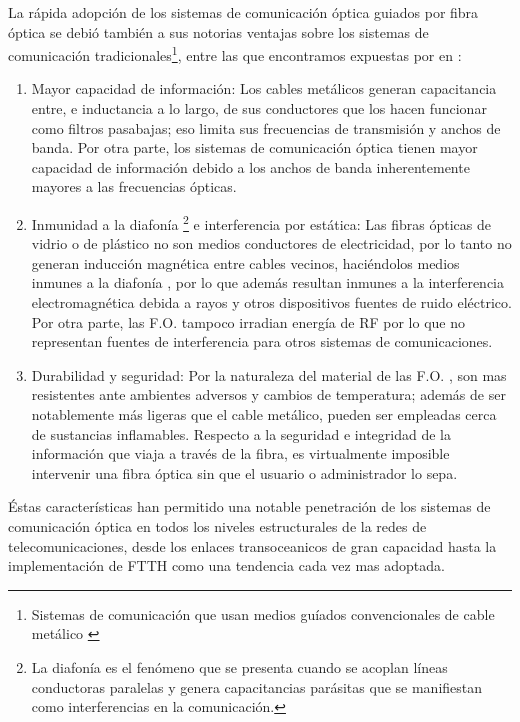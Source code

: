 La rápida adopción de los sistemas de comunicación óptica guiados por fibra óptica se debió también a sus notorias ventajas sobre los sistemas de comunicación tradicionales\footnote{Sistemas de comunicación que usan medios guíados convencionales de cable metálico \citep{Tomasi2003}}, entre las que encontramos expuestas por \citeauthor*{Tomasi2003} en \citep{Tomasi2003}: 

\begin{enumerate}
    \item Mayor capacidad de información: 
        Los cables metálicos generan capacitancia entre, e inductancia a lo largo, de sus conductores que los hacen funcionar como filtros pasabajas; eso limita sus frecuencias de transmisión y anchos de banda. Por otra parte, los sistemas de comunicación óptica tienen mayor capacidad de información debido a los anchos de banda inherentemente mayores a las frecuencias ópticas. 
    
    \item Inmunidad a la diafonía \footnote{La diafonía es el fenómeno que se presenta cuando se acoplan líneas conductoras paralelas y genera capacitancias parásitas que se manifiestan como interferencias en la comunicación.} e interferencia por estática: 
        Las fibras ópticas de vidrio o de plástico no son medios conductores de electricidad, por lo tanto no generan inducción magnética entre cables vecinos, haciéndolos medios inmunes a la diafonía \citep{nerivela}, por lo que además resultan inmunes a la interferencia electromagnética debida a rayos y otros dispositivos fuentes de ruido eléctrico. Por otra parte, las F.O. tampoco irradian energía de RF por lo que no representan fuentes de interferencia para otros sistemas de comunicaciones. 

    \item Durabilidad y seguridad: 
        Por la naturaleza del material de las F.O. , son mas resistentes ante ambientes adversos y cambios de temperatura; además de ser notablemente más ligeras que el cable metálico, pueden ser empleadas cerca de sustancias inflamables. Respecto a la seguridad e integridad de la información que viaja a través de la fibra, es virtualmente imposible intervenir una fibra óptica sin que el usuario o administrador lo sepa.
    
\end{enumerate}

Éstas características han permitido una notable penetración de los sistemas de comunicación óptica en todos los niveles estructurales de la redes de telecomunicaciones, desde los enlaces transoceanicos de gran capacidad hasta la implementación de FTTH como una tendencia cada vez mas adoptada.

